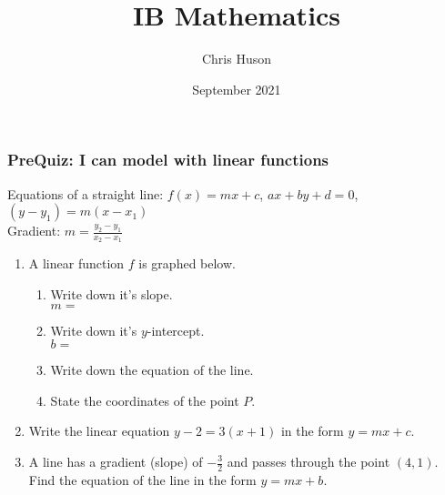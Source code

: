 \documentclass[12pt, twoside]{article}
\title{IB Mathematics}
\author{Chris Huson}
\date{September 2021}
\begin{document}
\subsubsection*{PreQuiz: I can model with linear functions}
Equations of a straight line: $f(x)=mx+c$, $ax+by+d=0$, $(y-y_1)=m(x-x_1)$\\[0.25cm]
Gradient: $\displaystyle m=\frac{y_2-y_1}{x_2-x_1}$ \vspace{1cm}
\begin{enumerate}
\item A linear function $f$ is graphed below.
\begin{multicols}{2}
\begin{enumerate}
  \item Write down it's slope.\\ $m=$
  \vspace{0.25cm}
  \item Write down it's $y$-intercept.\\ $b=$
  \vspace{0.25cm}
  \item Write down the equation of the line.
  \vspace{1cm}
  \item State the coordinates of the point $P$.
\end{enumerate} \vspace{.5cm}
  \begin{center} 
  \end{center}
\end{multicols}

\item Write the linear equation $y-2=3(x+1)$ in the form $y=mx+c$. \vspace{4cm}

\item A line has a gradient (slope) of $\displaystyle -\frac{3}{2}$ and passes through the point $(4, 1)$. Find the equation of the line in the form $y=mx+b$.


\end{enumerate}
\end{document}
